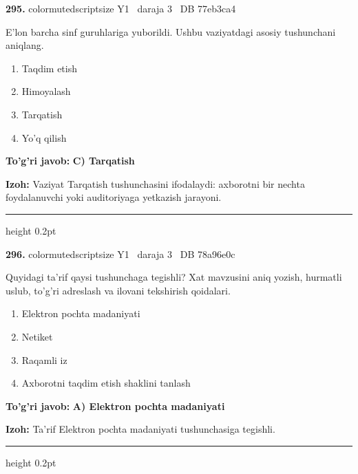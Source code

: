 \documentclass[10pt,a4paper,oneside]{article}
\begin{document}
\noindent\textbf{\color{ink}295.}  {color{muted}scriptsize Y1 \textbullet\ daraja 3 \textbullet\ DB 77eb3ca4}
\par
E'lon barcha sinf guruhlariga yuborildi. Ushbu vaziyatdagi asosiy tushunchani aniqlang.
\begin{enumerate}[label=\Alph*),leftmargin=9mm]
\item Taqdim etish
\item Himoyalash
\item Tarqatish
\item Yo'q qilish
\end{enumerate}
\begin{tcolorbox}[enhanced,breakable,colback=teal!4,colframe=teal!50!black,boxrule=0.5pt,arc=1.1mm,left=3mm,right=3mm,top=1.7mm,bottom=1.7mm,before skip=2mm,after skip=2mm]
\textbf{\color{teal}To'g'ri javob:} \textbf{C) Tarqatish}
\par\smallskip
\textbf{Izoh:} Vaziyat Tarqatish tushunchasini ifodalaydi: axborotni bir nechta foydalanuvchi yoki auditoriyaga yetkazish jarayoni.
\end{tcolorbox}
\vspace{2mm}\hrule height 0.2pt \vspace{3mm}

\noindent\textbf{\color{ink}296.}  {color{muted}scriptsize Y1 \textbullet\ daraja 3 \textbullet\ DB 78a96e0c}
\par
Quyidagi ta'rif qaysi tushunchaga tegishli? Xat mavzusini aniq yozish, hurmatli uslub, to'g'ri adreslash va ilovani tekshirish qoidalari.
\begin{enumerate}[label=\Alph*),leftmargin=9mm]
\item Elektron pochta madaniyati
\item Netiket
\item Raqamli iz
\item Axborotni taqdim etish shaklini tanlash
\end{enumerate}
\begin{tcolorbox}[enhanced,breakable,colback=teal!4,colframe=teal!50!black,boxrule=0.5pt,arc=1.1mm,left=3mm,right=3mm,top=1.7mm,bottom=1.7mm,before skip=2mm,after skip=2mm]
\textbf{\color{teal}To'g'ri javob:} \textbf{A) Elektron pochta madaniyati}
\par\smallskip
\textbf{Izoh:} Ta'rif Elektron pochta madaniyati tushunchasiga tegishli.
\end{tcolorbox}
\vspace{2mm}\hrule height 0.2pt \vspace{3mm}
\end{document}

